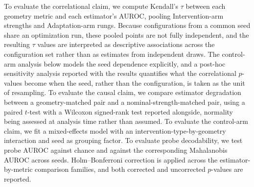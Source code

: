 To evaluate the correlational claim, we compute Kendall's $\tau$ between each
geometry metric and each estimator's AUROC, pooling Intervention-arm
strengths and Adaptation-arm rungs. Because configurations from a common seed
share an optimization run, these pooled points are not fully independent, and
the resulting $\tau$ values are interpreted as descriptive associations across
the configuration set rather than as estimates from independent draws. The
control-arm analysis below models the seed dependence explicitly, and a post-hoc
sensitivity analysis reported with the results quantifies what the correlational
$p$-values become when the seed, rather than the configuration, is taken as the
unit of resampling. To evaluate the causal claim, we compare
estimator degradation between a geometry-matched pair and a
nominal-strength-matched pair, using a paired $t$-test with a Wilcoxon
signed-rank test reported alongside, normality being assessed at analysis
time rather than assumed. To evaluate the control-arm claim, we fit a
mixed-effects model with an intervention-type-by-geometry interaction and
seed as grouping factor. To evaluate probe decodability, we test probe AUROC
against chance and against the corresponding Mahalanobis AUROC across seeds.
Holm--Bonferroni correction is applied across the estimator-by-metric
comparison families, and both corrected and uncorrected $p$-values are
reported.
